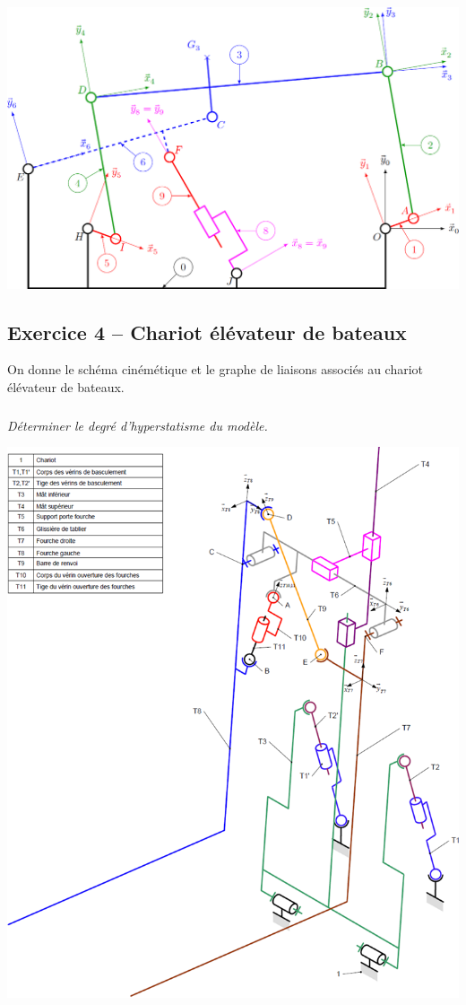 \documentclass[10pt,fleqn]{article} %
\begin{document}
\begin{multicols}{2}
\begin{center}
\includegraphics[width=\linewidth]{images/aero_06.png}
\end{center}

\subsection*{Exercice 4 -- Chariot élévateur de bateaux}
On donne le schéma cinémétique et le graphe de liaisons associés au chariot élévateur de bateaux. 
\setcounter{exo}{0}
\subparagraph{}\textit{Déterminer le degré d'hyperstatisme du modèle.}
\begin{center}
\includegraphics[width=.8\linewidth]{images/fig_11.png}
\end{center}


\end{multicols}
\end{document}
